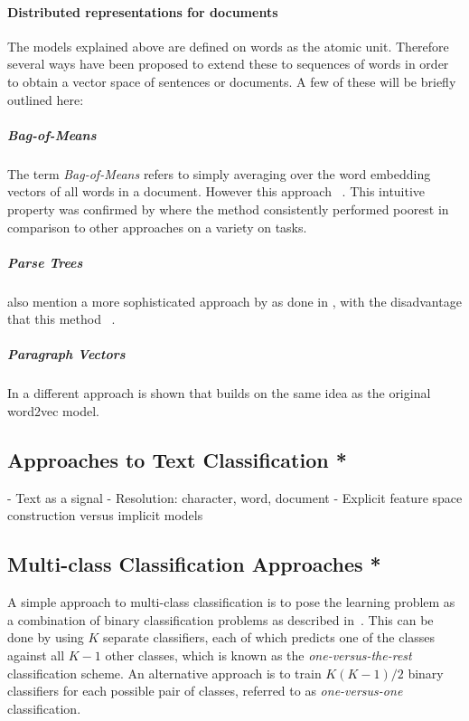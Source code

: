 \paragraph{Distributed representations for documents}

The models explained above are defined on words as the atomic unit. Therefore several ways have been proposed to extend these to sequences of words in order to obtain a vector space of sentences or documents. A few of these will be briefly outlined here:

\subparagraph{Bag-of-Means}
\label{subp:Bag-of-Means}
The term \emph{Bag-of-Means} refers to simply averaging over the word embedding vectors of all words in a document. However this approach ~\cite{Le:2014aa}. This intuitive property was confirmed by \cite{Zhang:2015aa} where the method consistently performed poorest in comparison to other approaches on a variety on tasks.

\subparagraph{Parse Trees} \cite{Le:2014aa} also mention a more sophisticated approach by  as done in \cite{Socher:2011aa}, with the disadvantage that this method ~\cite{Le:2014aa}.

\subparagraph{Paragraph Vectors}
In \cite{Le:2014aa} a different approach is shown that builds on the same idea as the original word2vec model.



\subsection{Approaches to Text Classification *}

- Text as a signal
- Resolution: character, word, document
- Explicit feature space construction versus implicit models

\subsection{Multi-class Classification Approaches *}

A simple approach to multi-class classification is to pose the learning problem as a combination of binary classification problems as described in~\cite[Chapter 4.1.2, p.~182]{Bishop:2006aa}. This can be done by using $K$ separate classifiers, each of which predicts one of the classes against all $K-1$ other classes, which is known as the \textit{one-versus-the-rest} classification scheme. An alternative approach is to train $K (K - 1) / 2$ binary classifiers for each possible pair of classes, referred to as \textit{one-versus-one} classification.


